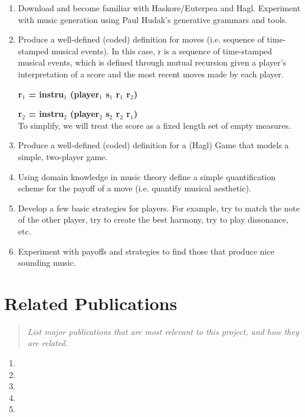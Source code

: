 \documentclass{proc}
\begin{document}
\begin{enumerate}
\item Download and become familiar with Haskore/Euterpea and Hagl.  Experiment with music generation using Paul Hudak's generative grammars and tools.

\item Produce a well-defined (coded) definition for moves (i.e. sequence of time-stamped musical events).  In this case, r is a sequence of time-stamped musical events, which is defined through mutual recursion given a player's interpretation of a score and the most recent moves made by each player.

\textbf{r$_{1}$ = instru$_{1}$ (player$_{1}$ s$_{1}$ r$_{1}$ r$_{2}$)} 

\textbf{r$_{2}$ = instru$_{2}$ (player$_{2}$ s$_{2}$ r$_{2}$ r$_{1}$)}  \\

 To simplify, we will treat the score as a fixed length set of empty measures.

\item Produce a well-defined (coded) definition for a (Hagl) Game that models a simple, two-player game.

\item Using domain knowledge in music theory define a simple quantification scheme for the payoff of a move (i.e. quantify musical aesthetic).

\item Develop a few basic strategies for players.  For example, try to match the note of the other player, try to create the best harmony, try to play dissonance, etc.

\item Experiment with payoffs and strategies to find those that produce nice sounding music.

\end{enumerate}

\section{Related Publications}
\begin{quote}
\textit{List major publications that are most relevant to this project, and how they are related.}
\end{quote}

\begin{enumerate} 
\item {}
\item {}
\item {}
\item {}
\item {}
\end{enumerate}
\end{document}

